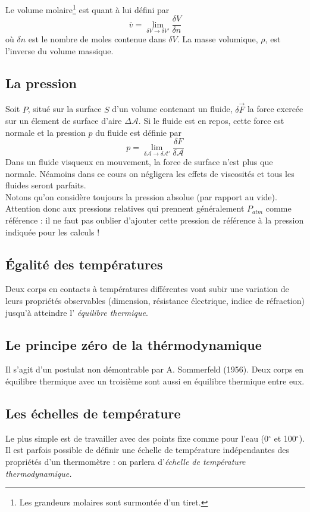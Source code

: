 	Le volume molaire\footnote{Les grandeurs molaires sont surmontée d'un 
	tiret.} est quant à lui défini par
	\begin{equation}
	\overline{v} = \lim\limits_{\delta V \rightarrow \delta V'} \frac{
	\delta V}{\delta n}
	\end{equation}
	où $\delta n$ est le nombre de moles contenue dans $\delta V$. La 
	masse volumique, $\rho$, est l'inverse du volume massique.
	
	
	\subsection{La pression}
	Soit $P$, situé sur la surface $S$ d'un volume contenant un fluide, 
	$\delta \vec F$ la force exercée sur un élement de surface d'aire 
	$\Delta \mathcal{A}$. Si le fluide est en repos, cette force est 
	normale et la pression $p$ du fluide est définie par
	\begin{equation}
	p = \lim\limits_{\delta\mathcal{A}\rightarrow\delta\mathcal{A}'} 
	\frac{\delta F}{\delta \mathcal{A}}
	\end{equation}		
	Dans un fluide visqueux en mouvement, la force de surface n'est 
	plus que normale. Néamoins dans ce cours on négligera les effets 
	de viscosités et tous les fluides seront parfaits.\\
	Notons qu'on considère toujours la pression absolue (par rapport 
	au vide). Attention donc aux pressions relatives qui prennent 
	généralement $P_{atm}$ comme référence : il ne faut pas oublier 
	d'ajouter cette pression de référence à la pression indiquée 
	pour les calculs !
	
	
	\subsection{Égalité des températures}
	Deux corps en contacts à températures différentes vont subir une 
	variation de leurs propriétés observables (dimension, résistance 
	électrique, indice de réfraction) jusqu'à atteindre l'\textit{
	équilibre thermique}.
	
	\subsection{Le principe zéro de la thérmodynamique}
	Il s'agit d'un postulat non démontrable par A. Sommerfeld (1956). 
	Deux corps en équilibre thermique avec un troisième sont aussi 
	en équilibre thermique entre eux.
	
	\subsection{Les échelles de température}
	Le plus simple est de travailler avec des points fixe comme pour 
	l'eau (0$^\circ$ et 100$^\circ$). Il est parfois possible de 
	définir une échelle de température indépendantes des propriétés 
	d'un thermomètre : on parlera d'\textit{échelle de température 
	thermodynamique.}
	
	
	
	
	
	
	
	
	
	
	
	
	
	
	
	
	
	
	
	
	
	
	
	
	
	
	
	
